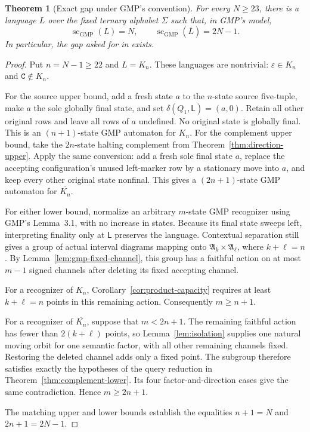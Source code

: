 \documentclass[11pt,a4paper]{article}
\newtheorem{theorem}{Theorem}[section]
\theoremstyle{definition}
\theoremstyle{remark}
\newcommand{\Alt}{\mathfrak A}
\newcommand{\LL}{\mathsf L}
\begin{document}
\begin{theorem}[Exact gap under GMP's convention]\label{thm:gmp-exact}
For every $N\ge23$, there is a language $L$ over the fixed ternary
alphabet $\Sigma$ such that, in GMP's model,
\[
 \operatorname{sc}_{\mathrm{GMP}}(L)=N,
 \qquad
 \operatorname{sc}_{\mathrm{GMP}}(\overline L)=2N-1.
\]
In particular, the gap asked for in
\cite[Section~6, p.~1186, problem~(e)]{GMP} exists.
\end{theorem}
\begin{proof}
Put $n=N-1\ge22$ and $L=K_n$. These languages are nontrivial:
$\varepsilon\in K_n$ and $\mathtt C\notin K_n$.

For the source upper bound, add a fresh state $a$ to the $n$-state
source five-tuple, make $a$ the sole globally final state, and set
$\delta(Q_1,\LL)=(a,0)$. Retain all other original rows and leave
all rows of $a$ undefined. No original state is globally final.
This is an $(n+1)$-state GMP automaton for $K_n$.
For the complement upper bound, take the $2n$-state halting complement
from Theorem~\ref{thm:direction-upper}. Apply the same conversion:
add a fresh sole final state $a$, replace the accepting configuration's
unused left-marker row by a stationary move into $a$, and keep every
other original state nonfinal. This gives a $(2n+1)$-state GMP
automaton for $\overline{K_n}$.

For either lower bound, normalize an arbitrary $m$-state GMP
recognizer using GMP's Lemma~3.1, with no increase in states.
Because its final state sweeps left, interpreting finality only at
$\LL$ preserves the language. Contextual separation still gives
a group of actual interval diagrams mapping onto
$\Alt_k\times\Alt_\ell$, where $k+\ell=n$.
By Lemma~\ref{lem:gmp-fixed-channel}, this group has a faithful
action on at most $m-1$ signed channels after deleting its fixed
accepting channel.

For a recognizer of $K_n$, Corollary~\ref{cor:product-capacity}
requires at least $k+\ell=n$ points in this remaining action.
Consequently $m\ge n+1$.

For a recognizer of $\overline{K_n}$, suppose that $m<2n+1$.
The remaining faithful action has fewer than $2(k+\ell)$ points,
so Lemma~\ref{lem:isolation} supplies one natural moving orbit for
one semantic factor, with all other remaining channels fixed.
Restoring the deleted channel adds only a fixed point. The subgroup
therefore satisfies exactly the hypotheses of the query reduction
in Theorem~\ref{thm:complement-lower}. Its four factor-and-direction
cases give the same contradiction. Hence $m\ge2n+1$.

The matching upper and lower bounds establish the equalities
$n+1=N$ and $2n+1=2N-1$.
\end{proof}
\end{document}

